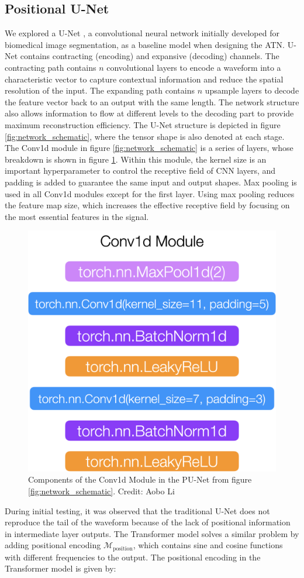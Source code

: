\subsection{Positional U-Net}
We explored a U-Net \cite{UNet}, a convolutional neural network initially developed for biomedical image segmentation, as a baseline model when designing the ATN. U-Net contains contracting (encoding) and expansive (decoding) channels. The contracting path contains $n$ convolutional layers to encode a waveform into a characteristic vector to capture contextual information and reduce the spatial resolution of the input. The expanding path contains $n$ upsample layers to decode the feature vector back to an output with the same length. The network structure also allows information to flow at different levels to the decoding part to provide maximum reconstruction efficiency. The U-Net structure is depicted in figure \ref{fig:network_schematic}, where the tensor shape is also denoted at each stage. The Conv1d module in figure \ref{fig:network_schematic} is a series of layers, whose breakdown is shown in figure \ref{ch6:fig:cov1d_break_down}. Within this module, the kernel size is an important hyperparameter to control the receptive field of CNN layers, and padding is added to guarantee the same input and output shapes. Max pooling is used in all Conv1d modules except for the first layer. Using max pooling reduces the feature map size, which increases the effective receptive field by focusing on the most essential features in the signal.

\begin{figure}[htb!]
    \centering
    \includegraphics[width=0.4\linewidth,trim={0pc 0pc 0pc 0pc},clip]{ch6/figs/conv1d.png}
    \caption{Components of the Conv1d Module in the PU-Net from figure \ref{fig:network_schematic}.  Credit: Aobo Li}
    \label{ch6:fig:cov1d_break_down}
\end{figure}

During initial testing, it was observed that the traditional U-Net does not reproduce the tail of the waveform because of the lack of positional information in intermediate layer outputs. The Transformer model \cite{Transformer} solves a similar problem by adding positional encoding $\mathcal{M}_{\mathrm{position}}$, which contains sine and cosine functions with different frequencies to the output. The positional encoding in the Transformer model is given by:

